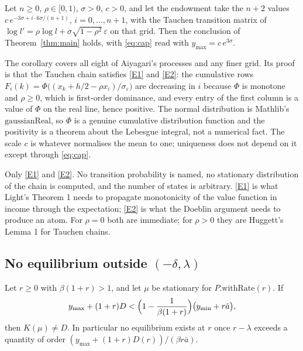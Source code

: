 \begin{corollary}\label{cor:tauchen}
Let $n\ge0$, $\rho\in[0,1)$, $\sigma>0$, $c>0$, and let the endowment take the $n+2$ values
$c\,e^{-3\sigma+i\cdot 6\sigma/(n+1)}$, $i=0,\dots,n+1$, with the Tauchen transition matrix of
$\log l'=\rho\log l+\sigma\sqrt{1-\rho^2}\,\varepsilon$ on that grid. Then the conclusion of
Theorem~\ref{thm:main} holds, with \eqref{eq:cap} read with $y_{\max}=c\,e^{3\sigma}$.
\end{corollary}

The corollary covers all eight of Aiyagari's processes and any finer grid. Its proof is that the
Tauchen chain satisfies \ref{E1} and \ref{E2}: the cumulative rows
$F_i(k)=\Phi\bigl((x_k+h/2-\rho x_i)/\sigma_\varepsilon\bigr)$ are decreasing in $i$ because $\Phi$
is monotone and $\rho\ge0$, which is first-order dominance, and every entry of the first column is
a value of $\Phi$ on the real line, hence positive. The normal distribution is Mathlib's
$\mathrm{gaussianReal}$, so $\Phi$ is a genuine cumulative distribution function and the
positivity is a theorem about the Lebesgue integral, not a numerical fact. The scale $c$ is
whatever normalises the mean to one; uniqueness does not depend on it except through
\eqref{eq:cap}.

\begin{remark}
Only \ref{E1} and \ref{E2}. No transition probability is named, no stationary distribution of the
chain is computed, and the number of states is arbitrary. \ref{E1} is what Light's Theorem 1 needs
to propagate monotonicity of the value function in income through the expectation; \ref{E2} is
what the Doeblin argument needs to produce an atom. For $\rho=0$ both are immediate; for $\rho>0$
they are Huggett's Lemma 1 for Tauchen chains.
\end{remark}

\subsection{No equilibrium outside \texorpdfstring{$(-\delta,\lambda)$}{the interval}}

\begin{theorem}\label{thm:above}
Let $r\ge0$ with $\beta(1+r)>1$, and let $\mu$ be stationary for $P.\text{withRate}(r)$. If
\[
  y_{\max}+(1+r)D<\Bigl(1-\frac{1}{\beta(1+r)}\Bigr)\bigl(y_{\min}+r\bar a\bigr),
\]
then $K(\mu)\ne D$. In particular no equilibrium exists at $r$ once $r-\lambda$ exceeds a
quantity of order $(y_{\max}+(1+r)D(r))/(\beta r\bar a)$.
\end{theorem}

